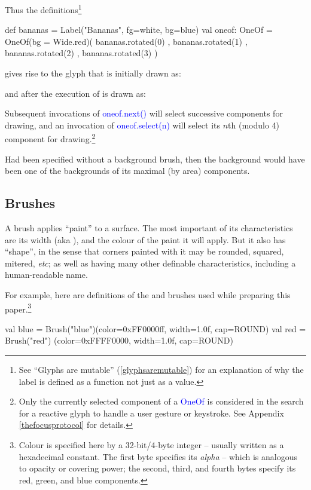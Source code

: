\documentclass[12pt,a4paper]{article}
\def\Scala#1{\textcolor{blue}{\textsf{#1}}}
\def\SS#1{\subsection{#1}}
\begin{document}
Thus the definitions\footnote{See ``Glyphs are mutable'' (\ref {glyphsaremutable}) for an explanation
of why the label is defined as a function not just as a value.}
\begin{scala}
  def bananas = Label("Bananas", fg=white, bg=blue)
  val oneof: OneOf =
      OneOf(bg = Wide.red)( bananas.rotated(0)
                          , bananas.rotated(1)
                          , bananas.rotated(2)
                          , bananas.rotated(3)
                          )
 \end{scala}
gives rise to the glyph that is initially drawn as:
\begin{center}
\end{center}

and after the execution of  is drawn as:
\begin{center}
\end{center}

Subsequent invocations of \Scala{oneof.next()} will select successive components
for drawing, and an invocation of \Scala{oneof.select(n)} will select its $n$th (modulo 4)
component for drawing.\footnote{Only the currently selected component of a
\Scala{OneOf} is considered in the search for a reactive glyph to handle
a user gesture or keystroke. See Appendix \ref{thefocusprotocol} for details.} 

Had  been specified without a background brush, then
the background would have been one of the backgrounds of its
maximal (by area) components.
\begin{center}
\end{center}


\clearpage
\SS{Brushes}
A brush applies ``paint'' to a surface. The
most important of its characteristics are its width (aka ), and
the colour of the paint it will apply. But it also has ``shape'', in the sense that
corners painted with it may be rounded, squared, mitered,
\textit{etc}; as well as having many other definable
characteristics, including a human-readable name.

For example, here are definitions of the  and  brushes
used while preparing this paper.\footnote{Colour
is specified here by a 32-bit/4-byte integer -- usually written as a hexadecimal
constant. The first byte specifies its
\textit{alpha} -- which is analogous to opacity or covering power; the second, third, and fourth bytes
specify its red, green, and blue components.} 
\begin{scala}
  val blue = Brush("blue")(color=0xFF0000ff,  width=1.0f, cap=ROUND)
  val red  = Brush("red") (color=0xFFFF0000,  width=1.0f, cap=ROUND)
\end{scala}
\end{document}
